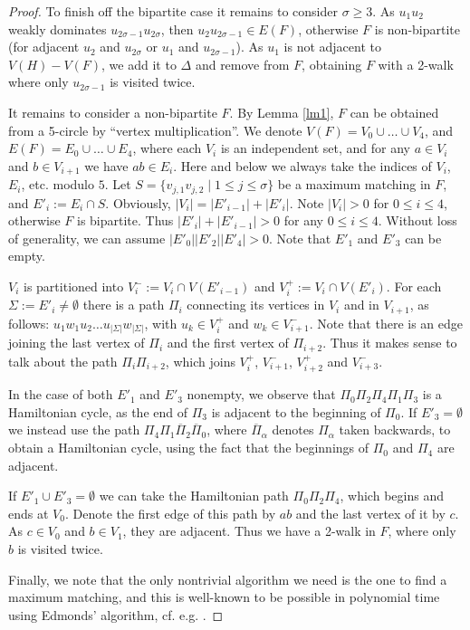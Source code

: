 \documentclass{amsart}
\theoremstyle{definition}
\begin{document}
\begin{proof}
To finish off the bipartite case it remains to consider $\sigma\geq 3$.
As $u_1u_2$ weakly dominates $u_{2\sigma-1}u_{2\sigma}$, then $u_2u_{2\sigma-1}\in E(F)$, 
otherwise $F$ is
non-bipartite (for adjacent $u_2$ and $u_{2\sigma}$ or $u_1$ and $u_{2\sigma-1}$).
As $u_1$ is not adjacent to   $V(H)-V(F)$, we add it to $\Delta$ and remove from $F$,
obtaining $F$ with a 2-walk where only $u_{2\sigma-1}$ is visited twice. 


\medskip

It remains to consider a non-bipartite $F$. By Lemma \ref{lm1},
$F$ can be obtained from a 5-circle by ``vertex multiplication''. We
denote $V(F)=V_0\cup \dots \cup V_4$, and
$E(F)=E_0\cup \dots \cup E_4$, where each $V_i$ is an
independent set, and  for any $a\in V_i$ and $b\in V_{i+1}$ we have $ab\in E_i$. 
Here and below we always take the indices of $V_i$, $E_i$, etc. modulo $5$.
Let $S=\{v_{j,1}v_{j,2}\mid 1\leq j\leq \sigma\}$ be a maximum matching in $F$, and $E'_i:=E_i\cap S$.
Obviously,
$|V_i|=|E'_{i-1}|+|E'_i|$. Note $|V_i|>0$ for $0\leq i\leq 4$, otherwise
$F$ is bipartite. Thus $|E'_i|+|E'_{i-1}|>0$ for any $0\leq i\leq 4$. 
Without loss of generality, we can assume $|E'_0||E'_2||E'_4|>0$.
Note that $E'_1$ and $E'_3$ can be empty.

$V_i$ is partitioned into
$V_i^-:= V_i\cap V(E'_{i-1})$ and 
$V_i^+:= V_i\cap V(E'_{i})$. For each $\Sigma:=E'_i\neq\emptyset$ there is
a path $\Pi_i$ connecting its vertices in $V_i$ and in $V_{i+1}$, 
as follows: $u_1 w_1 u_2\dots u_{|\Sigma|}w_{|\Sigma|}$, with 
$u_k\in V_i^+$ and $w_k\in V_{i+1}^-$.%
Note that there is an edge joining the last vertex of $\Pi_i$ and
the first vertex of $\Pi_{i+2}$. Thus it makes sense to talk about the path
$\Pi_i\Pi_{i+2}$, which joins $V_i^+$, $V_{i+1}^-$, $V_{i+2}^+$ and
$V_{i+3}^-$.

In the case of both $E'_1$ and $E'_3$ nonempty, we observe that 
$\Pi_0\Pi_2\Pi_4\Pi_1\Pi_3$ is a Hamiltonian cycle, as the end of
$\Pi_3$ is adjacent to the beginning of $\Pi_0$. 
If $E'_3=\emptyset$  
we instead use the path 
$\Pi_4\Pi_1\overline{\Pi}_2\overline{\Pi}_0$, where $\overline{\Pi}_\alpha$
denotes $\Pi_\alpha$ taken backwards, to obtain a Hamiltonian
cycle, using the fact that the beginnings of $\Pi_0$ and $\Pi_4$ are
adjacent.

If $E'_1\cup E'_3=\emptyset$ 
we can take the Hamiltonian path $\Pi_0\Pi_2\Pi_4$, 
which begins and ends at $V_0$. Denote the first
edge of this path by $ab$ and the last vertex of it 
by $c$. As $c\in V_0$ and $b\in V_1$, they are adjacent.
Thus we have a 2-walk in $F$, where only $b$ is visited
twice.

Finally, we note that the only nontrivial algorithm we need is the one to find a maximum matching, and this is 
well-known to be possible in polynomial time using Edmonds' algorithm, cf. e.g. \cite[Sect. 16.5]{bomu08}.
\end{proof}
\end{document}
